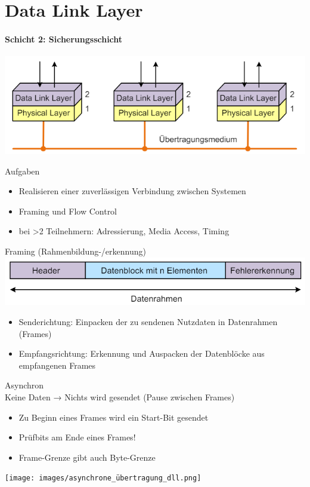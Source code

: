 \section{Data Link Layer}
\paragraph{Schicht 2: Sicherungsschicht}
\includegraphics[width=0.5\linewidth]{images/data_link_layer.png}
\begin{definition}{Aufgaben}
    \begin{itemize}
        \item Realisieren einer zuverlässigen Verbindung zwischen Systemen
        \item Framing und Flow Control
        \item bei >2 Teilnehmern: Adressierung, Media Access, Timing
    \end{itemize}
\end{definition}

\begin{definition}{Framing (Rahmenbildung-/erkennung)}\\
    \includegraphics[width=0.6\linewidth]{images/frame_def.png}
    \begin{itemize}
        \item Senderichtung: Einpacken der zu sendenen Nutzdaten in Datenrahmen (Frames)
        \item Empfangsrichtung: Erkennung und Auspacken der Datenblöcke aus empfangenen Frames
    \end{itemize}
\end{definition}

\begin{concept}{Asynchron}\\
    Keine Daten → Nichts wird gesendet (Pause zwischen Frames)
    \begin{itemize}
        \item Zu Beginn eines Frames wird ein Start-Bit gesendet
        \item Prüfbits am Ende eines Frames!
        \item Frame-Grenze gibt auch Byte-Grenze
    \end{itemize}
    \texttt{[image: images/asynchrone\_übertragung\_dll.png]}
\end{concept}

